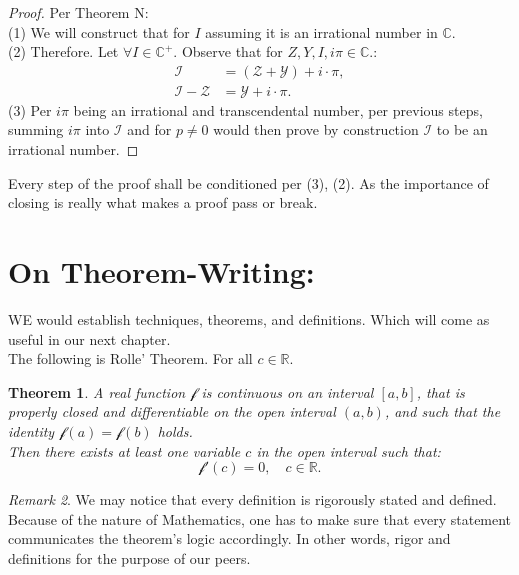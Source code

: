 \documentclass[10pt]{article}
\theoremstyle{plain}
\newtheorem{theorem}{Theorem}[section]
\theoremstyle{definition}
\theoremstyle{remark}
\newtheorem{remark}[theorem]{Remark}
\begin{document}
\begin{proof}
	Per Theorem N:\\
	(1) We will construct that for $I$ assuming it is an irrational number in $\mathbb{C}$.\\
	(2) Therefore. Let $\forall I \in \mathbb{C}^{+}.$ Observe that for $Z, Y, I, i\pi \in \mathbb{C}.$:
	\begin{align*}
		\mathcal{I} &= (\mathcal{Z}+\mathcal{Y})+i \cdot \pi,\\
		\mathcal{I}-\mathcal{Z} &= \mathcal{Y}+i \cdot \pi.
	\end{align*}
	(3) Per $i\pi$ being an irrational and transcendental number, per previous steps, summing $i\pi$ into $\mathcal{I}$ and for $p \neq 0$ would then prove by construction $\mathcal{I}$ to be an irrational number.
\end{proof}
Every step of the proof shall be conditioned per (3), (2). As the importance of closing is really what makes a proof pass or break.

\section{On Theorem-Writing:}

\lettrine[lines=2, lhang=0.1, loversize=0.2]{W}E would establish techniques, theorems, and definitions. Which will come as useful in our next chapter.\\
The following is Rolle' Theorem. For all $c \in \mathbb{R}.$

\begin{theorem}
	A real function $\mathcal{f}$ is continuous on an interval $[a, b]$, that is properly closed and differentiable on the open interval $(a, b)$, and such that the identity $\mathcal{f}(a) = \mathcal{f}(b)$ holds.\\Then there exists at least one variable $c$ in the open interval such that:
	\begin{equation}
		\mathcal{f}'(c) = 0, \quad c \in \mathbb{R}.
	\end{equation}
\end{theorem}

\begin{remark}
We may notice that every definition is rigorously stated and defined. Because of the nature of Mathematics, one has to make sure that every statement communicates the theorem's logic accordingly. In other words, rigor and definitions for the purpose of our peers.
\end{remark}
\end{document}
